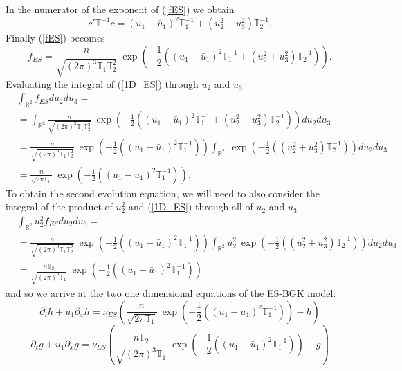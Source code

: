%
In the numerator of the exponent of (\ref{fES}) we obtain
%
\begin{equation*}
c' \mathbb{T}^{-1} c = (u_1 - \bar{u}_1)^2 \mathbb{T}_1^{-1} + (u_2^2 + u_3^2) \mathbb{T}_2^{-1}.
\end{equation*}
%
Finally (\ref{fES}) becomes
%
\begin{equation}
\label{1D_ES}
f_{ES} = \frac{n}{\sqrt{(2 \pi)^3 \mathbb{T}_1 \mathbb{T}_2^2}} \ \exp{\left(-\frac{1}{2} \left( (u_1 - \bar{u}_1)^2 \mathbb{T}_1^{-1} + (u_2^2 + u_3^2) \mathbb{T}_2^{-1} \right) \right)}.
\end{equation}
%
Evaluating the integral of (\ref{1D_ES}) through $u_2$ and $u_3$
%
\begin{align*}
&\int_{\mathbb{R}^2} f_{ES} d u_2 d u_3 =\\
&= \int_{\mathbb{R}^2} \frac{n}{\sqrt{(2 \pi)^3 \mathbb{T}_1 \mathbb{T}_2^2}} \ \exp{\left(-\frac{1}{2} \left( (u_1 - \bar{u}_1)^2 \mathbb{T}_1^{-1} + (u_2^2 + u_3^2) \mathbb{T}_2^{-1} \right) \right)} du_2 du_3\\
&= \frac{n}{\sqrt{(2 \pi)^3 \mathbb{T}_1 \mathbb{T}_2^2}} \ \exp{\left(-\frac{1}{2} \left( (u_1 - \bar{u}_1)^2 \mathbb{T}_1^{-1} \right) \right)} \int_{\mathbb{R}^2} \ \exp{\left(-\frac{1}{2} \left( (u_2^2 + u_3^2) \mathbb{T}_2^{-1} \right) \right)} du_2 du_3\\
&= \frac{n}{\sqrt{2 \pi \mathbb{T}_1}} \ \exp{\left(-\frac{1}{2} \left( (u_1 - \bar{u}_1)^2 \mathbb{T}_1^{-1} \right) \right)}.
\end{align*}
%
To obtain the second evolution equation, we will need to also consider the integral of the product of $u_2^2$ and (\ref{1D_ES}) through all of $u_2$ and $u_3$
%
\begin{align*}
&\int_{\mathbb{R}^2} u_2^2 f_{ES} d u_2 d u_3 =\\
&= \frac{n}{\sqrt{(2 \pi)^3 \mathbb{T}_1 \mathbb{T}_2^2}} \ \exp{\left(-\frac{1}{2} \left( (u_1 - \bar{u}_1)^2 \mathbb{T}_1^{-1} \right) \right)} \int_{\mathbb{R}^2} u_2^2 \ \exp{\left(-\frac{1}{2} \left( (u_2^2 + u_3^2) \mathbb{T}_2^{-1} \right) \right)} du_2 du_3\\
&= \frac{n \mathbb{T}_2}{\sqrt{(2 \pi)^3 \mathbb{T}_1}} \ \exp{\left(-\frac{1}{2} \left( (u_1 - \bar{u}_1)^2 \mathbb{T}_1^{-1} \right) \right)}
\end{align*}
%
and so we arrive at the two one dimensional equations of the ES-BGK model:
%
\begin{equation*}
\partial_t h + u_1 \partial_x h = \nu_{ES} \left(\frac{n}{\sqrt{2 \pi \mathbb{T}_1}} \ \exp{\left(-\frac{1}{2} \left( (u_1 - \bar{u}_1)^2 \mathbb{T}_1^{-1} \right) \right)} - h\right)
\end{equation*}
%
\begin{equation*}
\partial_t g + u_1 \partial_x g = \nu_{ES} \left( \frac{n \mathbb{T}_2}{\sqrt{(2 \pi)^3 \mathbb{T}_1}} \ \exp{\left(-\frac{1}{2} \left( (u_1 - \bar{u}_1)^2 \mathbb{T}_1^{-1} \right) \right)} - g \right)
\end{equation*}
